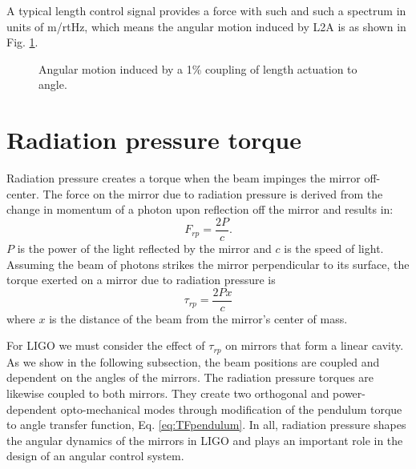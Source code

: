 A typical length control signal provides a force with such and such a
spectrum in units of m/rtHz, which means the angular motion induced by
L2A is as shown in Fig. \ref{}.

\begin{figure}
\begin{centering}
\caption{Angular motion induced by a 1\% coupling of length actuation to angle.}
\label{fig:}
\end{centering}
\end{figure}




\section{Radiation pressure torque}
Radiation pressure creates a torque when the beam impinges the mirror
off-center. The force on the mirror due to radiation pressure is
derived from the change in momentum of a photon upon reflection off
the mirror and results in:
\begin{equation}
F_{rp} = \frac{2 P} {c}.
\end{equation}
$P$ is the power of the light reflected by the mirror and $c$ is the
speed of light. Assuming the beam of photons strikes the mirror
perpendicular to its surface, the torque exerted on a mirror due to
radiation pressure is
\begin{equation}
\tau_{rp} = \frac{2 P x} {c}
\label{eq:tau_rp}
\end{equation}
where $x$ is the distance of the beam from the mirror's center of
mass. 

For LIGO we must consider the effect of $\tau_{rp}$ on mirrors that
form a linear cavity. As we show in the following subsection, the beam
positions are coupled and dependent on the angles of the mirrors. The
radiation pressure torques are likewise coupled to both mirrors. They
create two orthogonal and power-dependent opto-mechanical modes
through modification of the pendulum torque to angle transfer
function, Eq. \ref{eq:TFpendulum}. In all, radiation pressure shapes
the angular dynamics of the mirrors in LIGO and plays an important
role in the design of an angular control system.


